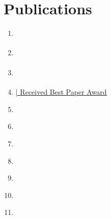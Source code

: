 \documentclass[a4paper,11pt]{article}
\begin{document}
\section{Publications}     \vspace{2pt}
\begin{enumerate}[nosep, after=\strut, leftmargin=1.2em, rightmargin=0.5em, itemsep=5.5pt]
		
		\item {} \href{https://doi.org/10.1007/s13369-024-08735-x}{ \faFilePdf[regular]}
		
		\item {} \href{https://doi.org/10.1049/pel2.12663}{\faFilePdf[regular]}
		
		\item {} \href{https://doi.org/10.1109/ICEEICT62016.2024.10534560}{\faFilePdf[regular]} %
		
		\item {} \href{https://doi.org/10.1109/IHCSP56702.2023.10127187}{\faFilePdf[regular] | \faAward\;\underline{Received Best Paper Award}} 
		
		\item {} \href{https://doi.org/10.1109/iCACCESS61735.2024.10499621}{\faFilePdf[regular]}
		
		\item {} \href{https://doi.org/10.1109/iCACCESS61735.2024.10499454}{\faFilePdf[regular]}
		
		\item {} \href{https://doi.org/0.1109/ICPS60393.2023.10428886}{\faFilePdf[regular]}
	
		\item {} \href{https://doi.org/10.1109/ICPS60393.2023.10428825}{\faFilePdf[regular]}
		
		\item {} \href{https://doi.org/10.1109/STI59863.2023.10464595}{\faFilePdf[regular]}
		
		\item {} \href{https://doi.org/10.1109/STI59863.2023.10464881}{\faFilePdf[regular]}
		
		\item {} \href{https://doi.org/10.1109/WIECON-ECE60392.2023.10456487}{\faFilePdf[regular]}
		

\end{enumerate}
\end{document}
